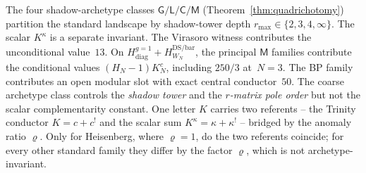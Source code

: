 \begin{remark}
\label{rem:archetype-vs-family-kappa-sum}
The four shadow-archetype classes $\mathsf{G}/\mathsf{L}/\mathsf{C}/\mathsf{M}$
\textup{(}Theorem~\ref{thm:quadrichotomy}\textup{)} partition the
standard landscape by shadow-tower depth
$r_{\max} \in \{2, 3, 4, \infty\}$.  The scalar $K^\kappa$ is a
separate invariant.  The Virasoro witness contributes the
unconditional value~$13$.  On
$H_{\mathrm{diag}}^{g=1}+H_{W_N}^{\mathrm{DS/bar}}$, the principal
$\mathsf M$ families contribute the conditional values
$(H_N-1)K_N^c$, including $250/3$ at~$N=3$.  The BP family contributes
an open modular slot with exact central conductor~$50$. The
coarse archetype class controls the \emph{shadow tower} and the
\emph{$r$-matrix pole order} but not the scalar
complementarity constant. One letter $K$ carries two
referents -- the Trinity conductor $K = c + c^!$ and the scalar
sum $K^\kappa = \kappa + \kappa^!$ -- bridged by the anomaly ratio
$\varrho$. Only for Heisenberg, where $\varrho = 1$, do the two
referents coincide; for every other standard family they differ by
the factor $\varrho$, which is not archetype-invariant.
\end{remark}

